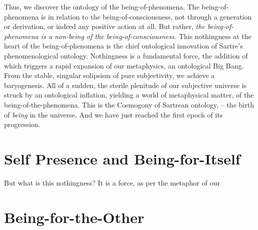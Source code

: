 Thus, we discover the ontology of the being-of-phenomena. The being-of-phenomena is in relation to the being-of-consciousness, not through a generation or derivation, or indeed any positive action at all. But rather, \emph{the being-of-phenomena is a non-being of the being-of-consciousness.} This nothingness at the heart of the being-of-phenomena is the chief ontological innovation of Sartre's phenomenological ontology. Nothingness is a fundamental force, the addition of which triggers a rapid expansion of our metaphysics, an ontological Big Bang. From the stable, singular solipsism of pure subjectivity, we achieve a baryogenesis. All of a sudden, the sterile plenitude of our subjective universe is struck by an ontological inflation, yielding a world of metaphysical matter, of the being-of-the-phenomena. This is the Cosmogony of Sartrean ontology, -- the birth of \emph{being} in the universe. And we have just reached the first epoch of its progression.


\section{Self Presence and Being-for-Itself}

But what is this nothingness? It is a force, as per the metaphor of our 


\section{Being-for-the-Other}



